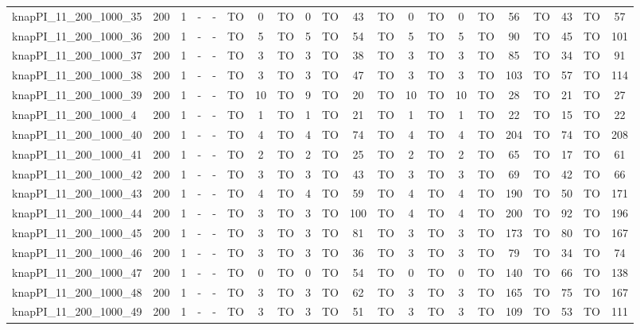 \begin{sidewaystable}[!ht]
{\begin{tabular}{lcccccccccccccccccccc}
knapPI\_11\_200\_1000\_35 & 200 & 1 &  - &  - & TO & 0 & TO & 0 & TO & 43 & TO & 0 & TO & 0 & TO & 56 & TO & 43 & TO & 57 \\
knapPI\_11\_200\_1000\_36 & 200 & 1 &  - &  - & TO & 5 & TO & 5 & TO & 54 & TO & 5 & TO & 5 & TO & 90 & TO & 45 & TO & 101 \\
knapPI\_11\_200\_1000\_37 & 200 & 1 &  - &  - & TO & 3 & TO & 3 & TO & 38 & TO & 3 & TO & 3 & TO & 85 & TO & 34 & TO & 91 \\
knapPI\_11\_200\_1000\_38 & 200 & 1 &  - &  - & TO & 3 & TO & 3 & TO & 47 & TO & 3 & TO & 3 & TO & 103 & TO & 57 & TO & 114 \\
knapPI\_11\_200\_1000\_39 & 200 & 1 &  - &  - & TO & 10 & TO & 9 & TO & 20 & TO & 10 & TO & 10 & TO & 28 & TO & 21 & TO & 27 \\
knapPI\_11\_200\_1000\_4 & 200 & 1 &  - &  - & TO & 1 & TO & 1 & TO & 21 & TO & 1 & TO & 1 & TO & 22 & TO & 15 & TO & 22 \\
knapPI\_11\_200\_1000\_40 & 200 & 1 &  - &  - & TO & 4 & TO & 4 & TO & 74 & TO & 4 & TO & 4 & TO & 204 & TO & 74 & TO & 208 \\
knapPI\_11\_200\_1000\_41 & 200 & 1 &  - &  - & TO & 2 & TO & 2 & TO & 25 & TO & 2 & TO & 2 & TO & 65 & TO & 17 & TO & 61 \\
knapPI\_11\_200\_1000\_42 & 200 & 1 &  - &  - & TO & 3 & TO & 3 & TO & 43 & TO & 3 & TO & 3 & TO & 69 & TO & 42 & TO & 66 \\
knapPI\_11\_200\_1000\_43 & 200 & 1 &  - &  - & TO & 4 & TO & 4 & TO & 59 & TO & 4 & TO & 4 & TO & 190 & TO & 50 & TO & 171 \\
knapPI\_11\_200\_1000\_44 & 200 & 1 &  - &  - & TO & 3 & TO & 3 & TO & 100 & TO & 4 & TO & 4 & TO & 200 & TO & 92 & TO & 196 \\
knapPI\_11\_200\_1000\_45 & 200 & 1 &  - &  - & TO & 3 & TO & 3 & TO & 81 & TO & 3 & TO & 3 & TO & 173 & TO & 80 & TO & 167 \\
knapPI\_11\_200\_1000\_46 & 200 & 1 &  - &  - & TO & 3 & TO & 3 & TO & 36 & TO & 3 & TO & 3 & TO & 79 & TO & 34 & TO & 74 \\
knapPI\_11\_200\_1000\_47 & 200 & 1 &  - &  - & TO & 0 & TO & 0 & TO & 54 & TO & 0 & TO & 0 & TO & 140 & TO & 66 & TO & 138 \\
knapPI\_11\_200\_1000\_48 & 200 & 1 &  - &  - & TO & 3 & TO & 3 & TO & 62 & TO & 3 & TO & 3 & TO & 165 & TO & 75 & TO & 167 \\
knapPI\_11\_200\_1000\_49 & 200 & 1 &  - &  - & TO & 3 & TO & 3 & TO & 51 & TO & 3 & TO & 3 & TO & 109 & TO & 53 & TO & 111 \\

\end{tabular}}
\end{sidewaystable}
